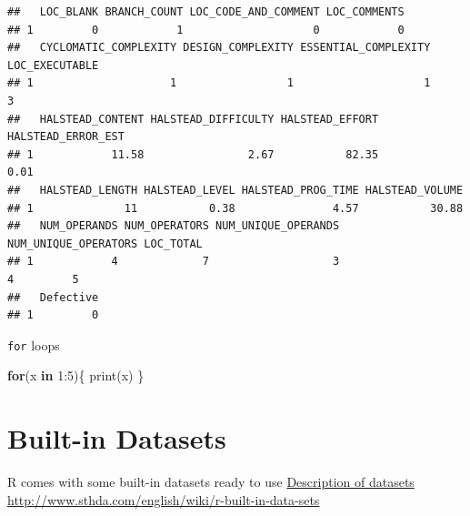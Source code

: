 \documentclass[
]{book}
\newenvironment{Shaded}{\begin{snugshade}}{\end{snugshade}}
\newcommand{\ControlFlowTok}[1]{\textcolor[rgb]{0.13,0.29,0.53}{\textbf{#1}}}
\newcommand{\DecValTok}[1]{\textcolor[rgb]{0.00,0.00,0.81}{#1}}
\newcommand{\FunctionTok}[1]{\textcolor[rgb]{0.00,0.00,0.00}{#1}}
\newcommand{\NormalTok}[1]{#1}
\newcommand{\OtherTok}[1]{\textcolor[rgb]{0.56,0.35,0.01}{#1}}
\newcommand{\SpecialCharTok}[1]{\textcolor[rgb]{0.00,0.00,0.00}{#1}}
\newcommand{\StringTok}[1]{\textcolor[rgb]{0.31,0.60,0.02}{#1}}
\begin{document}
\begin{Shaded}
\end{Shaded}

\begin{verbatim}
##   LOC_BLANK BRANCH_COUNT LOC_CODE_AND_COMMENT LOC_COMMENTS
## 1         0            1                    0            0
##   CYCLOMATIC_COMPLEXITY DESIGN_COMPLEXITY ESSENTIAL_COMPLEXITY LOC_EXECUTABLE
## 1                     1                 1                    1              3
##   HALSTEAD_CONTENT HALSTEAD_DIFFICULTY HALSTEAD_EFFORT HALSTEAD_ERROR_EST
## 1            11.58                2.67           82.35               0.01
##   HALSTEAD_LENGTH HALSTEAD_LEVEL HALSTEAD_PROG_TIME HALSTEAD_VOLUME
## 1              11           0.38               4.57           30.88
##   NUM_OPERANDS NUM_OPERATORS NUM_UNIQUE_OPERANDS NUM_UNIQUE_OPERATORS LOC_TOTAL
## 1            4             7                   3                    4         5
##   Defective
## 1         0
\end{verbatim}

\texttt{for} loops

\begin{Shaded}
\begin{Highlighting}[]
\ControlFlowTok{for}\NormalTok{(x }\ControlFlowTok{in} \DecValTok{1}\SpecialCharTok{:}\DecValTok{5}\NormalTok{)\{}
  \FunctionTok{print}\NormalTok{(x)}
\NormalTok{\}}
\end{Highlighting}
\end{Shaded}

\hypertarget{built-in-datasets}{%
\section{Built-in Datasets}\label{built-in-datasets}}

R comes with some built-in datasets ready to use
\href{http://www.sthda.com/english/wiki/r-built-in-data-sets}{Description of datasets}
\url{http://www.sthda.com/english/wiki/r-built-in-data-sets}
\end{document}
